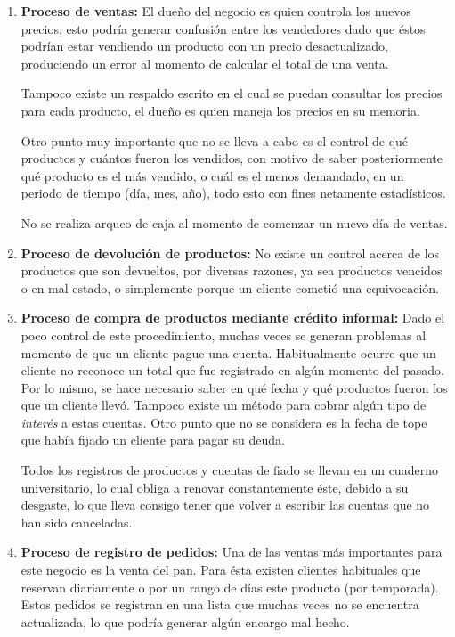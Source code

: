 \documentclass[letterpaper,12pt]{article}
\begin{document}
\begin{enumerate}
\item \textbf{Proceso de ventas:}
El dueño del negocio es quien controla los nuevos precios, esto podría generar confusión entre los vendedores dado 
que éstos podrían estar vendiendo un producto con un precio desactualizado, produciendo un error al momento 
de calcular el total de una venta.

Tampoco existe un respaldo escrito en el cual se puedan consultar
los precios para cada producto, el dueño es quien maneja los precios en su memoria. 

Otro punto muy importante que no se lleva a cabo es el control de qué productos y cuántos fueron los vendidos, con motivo de 
saber posteriormente qué producto es el más vendido, o cuál es el menos demandado, en un periodo de tiempo 
(día, mes, año), todo esto con fines netamente estadísticos.

No se realiza arqueo de caja al momento de comenzar un nuevo día de ventas.

\item \textbf{Proceso de devolución de productos:}
No existe un control acerca de los productos que son devueltos, por diversas razones, ya sea 
productos vencidos o en mal estado, o simplemente porque un cliente cometió una equivocación.

\item \textbf{Proceso de compra de productos mediante crédito informal:}
Dado el poco control de este procedimiento, muchas veces se generan problemas al momento de que un 
cliente pague una cuenta. Habitualmente ocurre que un cliente no reconoce un total que fue registrado
en algún momento del pasado. Por lo mismo, se hace necesario saber en qué fecha y qué productos fueron
los que un cliente llevó. Tampoco existe un método para cobrar algún tipo de \emph{interés} a estas cuentas.
Otro punto que no se considera es la fecha de tope que había fijado un cliente para pagar su deuda. 

Todos los registros de productos y cuentas de fiado se llevan en un cuaderno universitario, lo cual obliga 
a renovar constantemente éste, debido a su desgaste, lo que lleva consigo tener que volver a escribir 
las cuentas que no han sido canceladas.

\item \textbf{Proceso de registro de pedidos:}
Una de las ventas más importantes para este negocio es la venta del pan. Para ésta existen clientes habituales
que reservan diariamente o por un rango de días este producto (por temporada). Estos pedidos se registran en una 
lista que muchas veces no se encuentra actualizada, lo que podría generar algún encargo mal hecho.


\end{enumerate}
\end{document}
